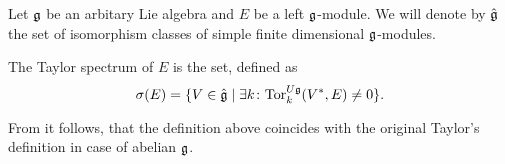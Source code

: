 Let $\mathfrak{g}$ be an arbitary Lie algebra and $E$ be a left $\mathfrak{g}$-module. 
We will denote by $\hat{\mathfrak{g}}$ the set of isomorphism classes of simple
finite dimensional $\mathfrak{g}$-modules.
\begin{definition}
    The Taylor spectrum of $E$ is the set, defined as
    \[
        \sigma(E)=\{ V\in \hat{\mathfrak{g}} \mid \exists 
            k \colon \mathrm{Tor}^{U\mathfrak{g}}_k(V^*,E)\neq 0\}.
    \]
\end{definition}
From  it follows, that the definition above coincides with the original Taylor's definition in case of abelian $\mathfrak{g}$.
